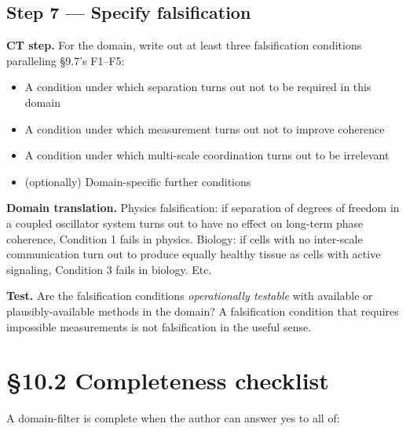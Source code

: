 \documentclass[11pt, openany]{book}
\newcommand{\sectionbreak}{\clearpage}
\begin{document}
\subsection{Step 7 --- Specify falsification}

\textbf{CT step.} For the domain, write out at least three falsification conditions paralleling §9.7's F1–F5:

\begin{itemize}
\item A condition under which separation turns out not to be required in this domain
\item A condition under which measurement turns out not to improve coherence
\item A condition under which multi-scale coordination turns out to be irrelevant
\item (optionally) Domain-specific further conditions
\end{itemize}

\textbf{Domain translation.} Physics falsification: if separation of degrees of freedom in a coupled oscillator system turns out to have no effect on long-term phase coherence, Condition 1 fails in physics. Biology: if cells with no inter-scale communication turn out to produce equally healthy tissue as cells with active signaling, Condition 3 fails in biology. Etc.

\textbf{Test.} Are the falsification conditions \textit{operationally testable} with available or plausibly-available methods in the domain? A falsification condition that requires impossible measurements is not falsification in the useful sense.

\sectionbreak

\section{§10.2 Completeness checklist}

A domain-filter is complete when the author can answer yes to all of:
\end{document}
